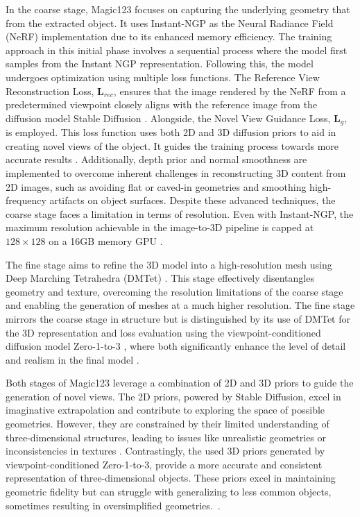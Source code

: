 In the coarse stage, Magic123 focuses on capturing the underlying geometry that from the extracted object. It uses Instant-NGP as the Neural Radiance Field (NeRF) implementation due to its enhanced memory efficiency. The training approach in this initial phase involves a sequential process where the model first samples from the Instant NGP representation. Following this, the model undergoes optimization using multiple loss functions. The Reference View Reconstruction Loss, \(\mathbf{L}_{rec}\), ensures that the image rendered by the NeRF from a predetermined viewpoint closely aligns with the reference image from the diffusion model Stable Diffusion \citep{rombachStableDiffusion}. Alongside, the Novel View Guidance Loss, \(\mathbf{L}_{g}\), is employed. This loss function uses both 2D and 3D diffusion priors to aid in creating novel views of the object. It guides the training process towards more accurate results \citep{qian2023magic123}. Additionally, depth prior and normal smoothness are implemented to overcome inherent challenges in reconstructing 3D content from 2D images, such as avoiding flat or caved-in geometries and smoothing high-frequency artifacts on object surfaces. Despite these advanced techniques, the coarse stage faces a limitation in terms of resolution. Even with Instant-NGP, the maximum resolution achievable in the image-to-3D pipeline is capped at \(128 \times 128\) on a 16GB memory GPU \citep{qian2023magic123}.

The fine stage aims to refine the 3D model into a high-resolution mesh using Deep Marching Tetrahedra (DMTet) \citep{qian2023magic123,shen2021DMTet}. This stage effectively disentangles geometry and texture, overcoming the resolution limitations of the coarse stage and enabling the generation of meshes at a much higher resolution. The fine stage mirrors the coarse stage in structure but is distinguished by its use of DMTet for the 3D representation and loss evaluation using the viewpoint-conditioned diffusion model Zero-1-to-3 \citep{liu2023zero1to3}, where both significantly enhance the level of detail and realism in the final model \citep{qian2023magic123}.

Both stages of Magic123 leverage a combination of 2D and 3D priors to guide the generation of novel views. The 2D priors, powered by Stable Diffusion, excel in imaginative extrapolation and contribute to exploring the space of possible geometries. However, they are constrained by their limited understanding of three-dimensional structures, leading to issues like unrealistic geometries or inconsistencies in textures \citep{qian2023magic123}. Contrastingly, the used 3D priors generated by viewpoint-conditioned Zero-1-to-3, provide a more accurate and consistent representation of three-dimensional objects. These priors excel in maintaining geometric fidelity but can struggle with generalizing to less common objects, sometimes resulting in oversimplified geometries.~\citep{qian2023magic123}.
